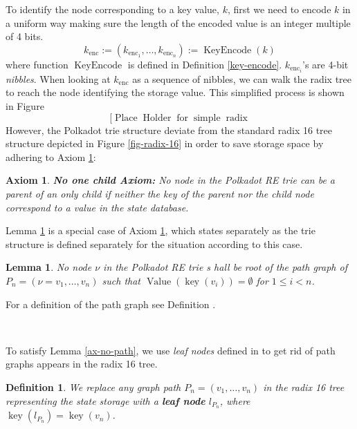 \documentclass{article}
\newcommand{\assign}{:=}
\newcommand{\tmem}[1]{{\em #1\/}}
\newcommand{\tmop}[1]{\ensuremath{\operatorname{#1}}}
\newcommand{\tmstrong}[1]{\textbf{#1}}
\newtheorem{axiom}{Axiom}
\newtheorem{definition}{Definition}
\newtheorem{lemma}{Lemma}
\begin{document}
To identify the node corresponding to a key value, $k$, first we need to
encode $k$ in a uniform way making sure the length of the encoded value is an
integer multiple of 4 bits. {}
\begin{equation}
  k_{\tmop{enc}} \assign (k_{\tmop{enc}_1}, \ldots, k_{\tmop{enc}_n}) \assign
  \tmop{KeyEncode} (k) \label{key-encode-in-trie}
\end{equation}
where function $\tmop{KeyEncode}$ is defined in Definition \ref{key-encode}.
$k_{\tmop{enc}_i}$'s are 4-bit {\tmem{nibbles}}. When looking at
$k_{\tmop{enc}}$ as a sequence of nibbles, we can walk the radix tree to reach
the node identifying the storage value. This simplified process is shown in
Figure \label{fig-simple-radix-tree-walk}
\begin{equation}
  [\tmop{Place} \tmop{Holder} \tmop{for} \tmop{simple} \tmop{radix}
\end{equation}
However, the Polkadot trie structure deviate from the standard radix 16 tree
structure depicted in Figure \ref{fig-radix-16} in order to save storage space
by adhering to Axiom \ref{ax-no-1-child}:

\begin{axiom}
  {\tmstrong{}}\label{ax-no-1-child}{\tmstrong{No one child Axiom:}} No node
  in the Polkadot RE trie can be a parent of an only child if neither the key of
  the parent nor the child node correspond to a value in the state
  database. \ \ 
\end{axiom}

Lemma \ref{lem-no-path} is a special case of Axiom \ref{ax-no-1-child}, which
states separately as the trie structure is defined separately for the situation
according to this case.

\begin{lemma}
  \label{lem-no-path}No node $\nu$ in the Polkadot RE trie s hall be root of the
  path graph of $P_n = (\nu = v_1, \ldots, v_n)$ such that $\tmop{Value}
  (\tmop{key} (v_i)) = \emptyset$ for $1 \leqslant i < n$.
\end{lemma}

For a definition of the path graph see Definition \label{def-path-graph}.

\

To satisfy Lemma \ref{ax-no-path}, we use {\tmem{leaf nodes}} defined in
\label{def-leaf-node} to get rid of path graphs appears in the radix 16 tree.

\begin{definition}
  We replace any graph path $P_n = (v_1, \ldots, v_n)$ in the radix 16 tree
  representing the state storage with a {\tmstrong{leaf node}} $l_{P_n}$,
  where $\tmop{key} (l_{P_n}) = \tmop{key} (v_n)$. 
\end{definition}
\end{document}
